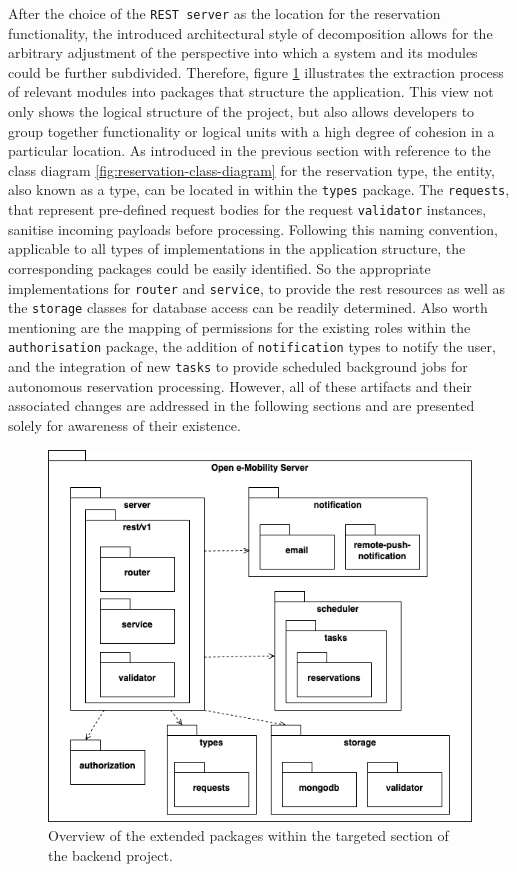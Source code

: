 After the choice of the \texttt{REST server} as the location for the reservation functionality, the introduced architectural style of decomposition allows for the arbitrary adjustment of the perspective into which a system and its modules could be further subdivided.
Therefore, figure \ref{fig:package-view} illustrates the extraction process of relevant modules into packages that structure the application. This view not only shows the logical structure of the project, but also allows developers to group together functionality or logical units with a high degree of cohesion in a particular location.
As introduced in the previous section with reference to the class diagram \ref{fig:reservation-class-diagram} for the reservation type, the entity, also known as a type, can be located in within the \texttt{types} package. 
The \texttt{requests}, that represent pre-defined request bodies for the request \texttt{validator} instances, sanitise incoming payloads before processing. Following this naming convention, applicable to all types of implementations in the application structure, the corresponding packages could be easily identified.
So the appropriate implementations for \texttt{router} and \texttt{service}, to provide the \acrshort{rest} resources as well as the \texttt{storage} classes for database access can be readily determined. 
Also worth mentioning are the mapping of permissions for the existing roles within the \texttt{authorisation} package, the addition of \texttt{notification} types to notify the user, and the integration of new \texttt{tasks} to provide scheduled background jobs for autonomous reservation processing.
However, all of these artifacts and their associated changes are addressed in the following sections and are presented solely for awareness of their existence.

\begin{figure}[h]
    \centering
    \includegraphics[scale=0.4]{resources/images/main/6_implementation/PackageDiagram.png}
    \caption{Overview of the extended packages within the targeted section of the backend project.}
    \label{fig:package-view}
\end{figure}

